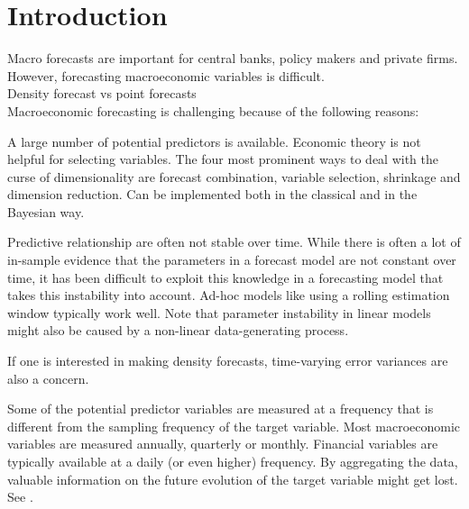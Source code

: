\chapter{Introduction} %


Macro forecasts are important for central banks, policy makers and private firms. However, forecasting macroeconomic variables is difficult.\\

Density forecast vs point forecasts\\



Macroeconomic forecasting is challenging because of the following reasons:

A large number of potential predictors is available. Economic theory is not helpful for selecting variables. The four most prominent ways to deal with the curse of dimensionality are forecast combination, variable selection, shrinkage and dimension reduction. Can be implemented both in the classical and in the Bayesian way. %

Predictive relationship are often not stable over time. While there is often a lot of in-sample evidence that the parameters in a forecast model are not constant over time, it has been difficult to exploit this knowledge in a forecasting model that takes this instability into account. Ad-hoc models like using a rolling estimation window typically work well. Note that parameter instability in linear models might also be caused by a non-linear data-generating process. \citep{Rossi2013, GiacominiRossi2015} %

If one is interested in making density forecasts, time-varying error variances are also a concern. %

Some of the potential predictor variables are measured at a frequency that is different from the sampling frequency of the target variable. Most macroeconomic variables are measured annually, quarterly or monthly. Financial variables are typically available at a daily (or even higher) frequency. By aggregating the data, valuable information on the future evolution of the target variable might get lost. See \citet{ForoniMarcellino2013}.
	
